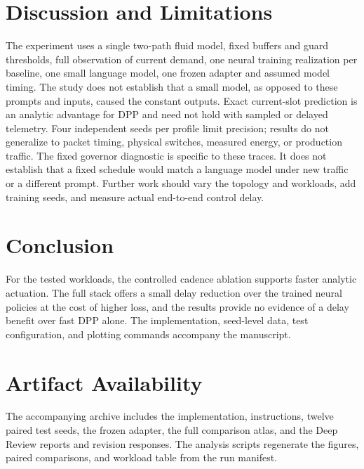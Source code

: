 \documentclass[conference]{IEEEtran}
\begin{document}


\section{Discussion and Limitations}
The experiment uses a single two-path fluid model, fixed buffers and guard thresholds, full observation of current demand, one neural training realization per baseline, one small language model, one frozen adapter and assumed model timing. The study does not establish that a small model, as opposed to these prompts and inputs, caused the constant outputs. Exact current-slot prediction is an analytic advantage for DPP and need not hold with sampled or delayed telemetry. Four independent seeds per profile limit precision; results do not generalize to packet timing, physical switches, measured energy, or production traffic. The fixed governor diagnostic is specific to these traces. It does not establish that a fixed schedule would match a language model under new traffic or a different prompt. Further work should vary the topology and workloads, add training seeds, and measure actual end-to-end control delay.

\section{Conclusion}
For the tested workloads, the controlled cadence ablation supports faster analytic actuation. The full stack offers a small delay reduction over the trained neural policies at the cost of higher loss, and the results provide no evidence of a delay benefit over fast DPP alone. The implementation, seed-level data, test configuration, and plotting commands accompany the manuscript.

\section*{Artifact Availability}
The accompanying archive includes the implementation, instructions, twelve paired test seeds, the frozen adapter, the full comparison atlas, and the Deep Review reports and revision responses. The analysis scripts regenerate the figures, paired comparisons, and workload table from the run manifest.



\end{document}
